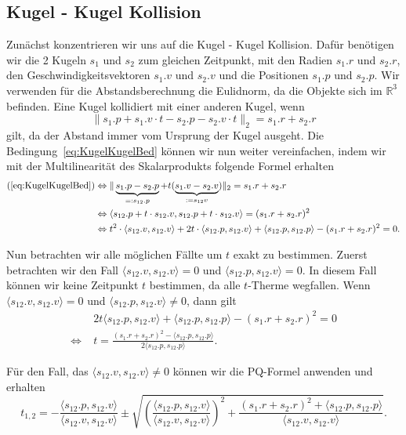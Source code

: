 \documentclass[a4paper, 10pt, openright, parskip, chapterprefix]{scrreprt}
\begin{document}
\subsection{Kugel - Kugel Kollision}
\noindent Zunächst konzentrieren wir uns auf die Kugel - Kugel Kollision. Dafür benötigen wir die 2 Kugeln 
$s_1$ und $s_2$ zum gleichen Zeitpunkt, mit den Radien $s_1.r$ und $s_2.r$, den Geschwindigkeitsvektoren
$s_1.v$ und $s_2.v$ und die Positionen $s_1.p$ und $s_2.p$. Wir verwenden für die Abstandsberechnung die
Eulidnorm, da die Objekte sich im $\mathbb{R}^{3}$ befinden. Eine Kugel kollidiert mit einer anderen
Kugel, wenn 
\begin{equation}
    \label{eq:KugelKugelBed}
    \|s_1.p + s_1.v \cdot t - s_2.p - s_2.v \cdot t \|_{2} = s_1.r + s_2.r
\end{equation}
gilt, da der Abstand immer vom Ursprung der Kugel ausgeht.
Die Bedingung~\ref{eq:KugelKugelBed} können wir nun weiter vereinfachen, indem wir mit der Multilinearität des Skalarprodukts folgende Formel erhalten
\begin{align*}
(\ref{eq:KugelKugelBed})  &\Leftrightarrow \|\underbrace{s_1.p - s_2.p}_{=: s_{12}.p} + t (\underbrace{s_1.v - s_2.v}_{:=s_{12}v})\|_{2}  = s_1.r + s_2.r\\
&\Leftrightarrow \langle s_{12}.p + t \cdot s_{12}.v, s_{12}.p + t \cdot s_{12}.v\rangle = (s_1.r + s_2.r)^{2}\\
&\Leftrightarrow t^{2} \cdot \langle s_{12}.v, s_{12}.v\rangle + 2t \cdot \langle s_{12}.p, s_{12}.v\rangle + \langle s_{12}.p, s_{12}.p\rangle -(s_1.r+s_2.r)^{2} = 0 \text{.}
\end{align*}

\noindent Nun betrachten wir alle möglichen Fällte um $t$ exakt zu bestimmen. Zuerst betrachten wir den Fall $\langle s_{12}.v, s_{12}.v \rangle = 0$ und 
$\langle s_{12}.p, s_{12}.v \rangle = 0$. In diesem Fall können wir keine Zeitpunkt $t$ bestimmen, da alle $t$-Therme wegfallen. Wenn
$\langle s_{12}.v, s_{12}.v \rangle = 0$ und $\langle s_{12}.p, s_{12}.v\rangle \not= 0$, dann gilt
\begin{align*}
&2t \langle s_{12}.p, s_{12}.v\rangle + \langle s_{12}.p, s_{12}.p \rangle - (s_{1}.r + s_{2}.r)^{2} = 0 \\
\Leftrightarrow \; &t  = \frac{(s_{1}.r + s_{2}.r)^{2} - \langle s_{12}.p, s_{12}.p \rangle}{2 \langle s_{12}.p, s_{12}.p\rangle}\text{.}
\end{align*}

\noindent  Für den Fall, das $\langle s_{12}.v, s_{12}.v \rangle \not= 0$ können wir die PQ-Formel anwenden und erhalten
\begin{equation*}
t_{1, 2} = -\frac{\langle s_{12}.p, s_{12}.v\rangle}{\langle s_{12}.v, s_{12}.v \rangle} \pm \sqrt{ \left( \frac{\langle s_{12}.p, s_{12}.v\rangle}{\langle s_{12}.v, s_{12}.v \rangle} \right)^{2} + \frac{(s_{1}.r + s_{2}.r)^{2} + \langle s_{12}.p, s_{12}.p\rangle}{\langle s_{12}.v, s_{12}.v \rangle}}\text{.}
\end{equation*}
\end{document}
